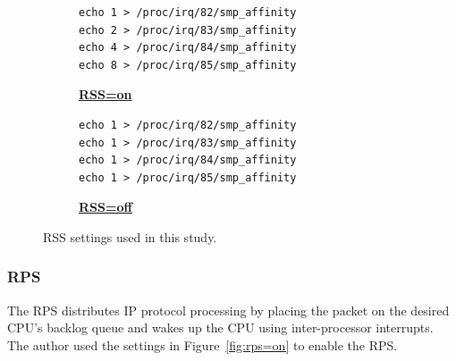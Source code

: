 \begin{figure}[h]

  \begin{subfigure}[t]{\columnwidth}
    \centering
    \begin{minipage}{0.6\columnwidth}
\begin{verbatim}
echo 1 > /proc/irq/82/smp_affinity
echo 2 > /proc/irq/83/smp_affinity
echo 4 > /proc/irq/84/smp_affinity
echo 8 > /proc/irq/85/smp_affinity
\end{verbatim}
    \end{minipage}
    \caption{\underline{\textbf{RSS=on}}}
    \label{fig:rss=on}
  \end{subfigure}

  \par\bigskip

  \begin{subfigure}[t]{\columnwidth}
    \centering
    \begin{minipage}{0.6\columnwidth}
\begin{verbatim}
echo 1 > /proc/irq/82/smp_affinity
echo 1 > /proc/irq/83/smp_affinity
echo 1 > /proc/irq/84/smp_affinity
echo 1 > /proc/irq/85/smp_affinity
\end{verbatim}
    \end{minipage}
    \caption{\underline{\textbf{RSS=off}}}
    \label{fig:rss=off}
  \end{subfigure}

  \par\bigskip
  \centering
  \begin{minipage}{0.9\columnwidth}
    \caption[RSS settings]{
      RSS settings used in this study.
    }
    \label{fig:rss_settings}
  \end{minipage}

  \par\bigskip
\end{figure}

\subsubsection{RPS}

The RPS distributes IP protocol processing by placing the packet
on the desired CPU's backlog queue and wakes up the CPU using inter-processor interrupts.
The author  used the settings in Figure~\ref{fig:rps=on} to enable the RPS.

